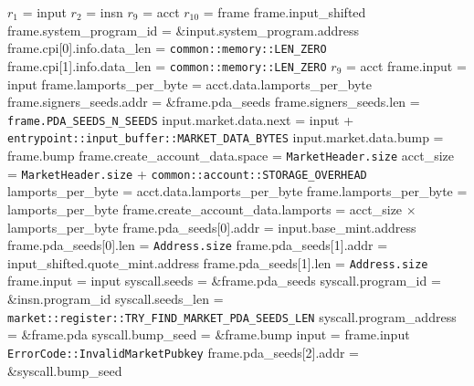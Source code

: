 \begin{algorithm}
\caption{INIT-MARKET-PDA}
\begin{algorithmic}
  \INPUT $r_1$ = input
  \INPUT $r_2$ = insn
  \INPUT $r_9$ = acct
  \INPUT $r_{10}$ = frame
  \REQUIRE frame.input\_shifted
  \REQUIRE frame.system\_program\_id = \&input.system\_program.address
  \REQUIRE frame.cpi[0].info.data\_len = \texttt{common::memory::LEN\_ZERO}
  \REQUIRE frame.cpi[1].info.data\_len = \texttt{common::memory::LEN\_ZERO}
  \ENSURE $r_9$ = acct
  \ENSURE frame.input = input
  \ENSURE frame.lamports\_per\_byte = acct.data.lamports\_per\_byte
  \ENSURE frame.signers\_seeds.addr = \&frame.pda\_seeds
  \ENSURE frame.signers\_seeds.len = \texttt{frame.PDA\_SEEDS\_N\_SEEDS}
  \ENSURE input.market.data.next = input + \texttt{entrypoint::input\_buffer::MARKET\_DATA\_BYTES}
  \ENSURE input.market.data.bump = frame.bump
  \STATE frame.create\_account\_data.space = \texttt{MarketHeader.size}
  \STATE acct\_size = \texttt{MarketHeader.size} + \texttt{common::account::STORAGE\_OVERHEAD}
  \STATE lamports\_per\_byte = acct.data.lamports\_per\_byte
  \STATE frame.lamports\_per\_byte = lamports\_per\_byte
  \STATE frame.create\_account\_data.lamports = acct\_size $\times$ lamports\_per\_byte
  \STATE frame.pda\_seeds[0].addr = input.base\_mint.address
  \STATE frame.pda\_seeds[0].len = \texttt{Address.size}
  \STATE frame.pda\_seeds[1].addr = input\_shifted.quote\_mint.address
  \STATE frame.pda\_seeds[1].len = \texttt{Address.size}
  \STATE frame.input = input
  \STATE syscall.seeds = \&frame.pda\_seeds
  \STATE syscall.program\_id = \&insn.program\_id
  \STATE syscall.seeds\_len = \texttt{market::register::TRY\_FIND\_MARKET\_PDA\_SEEDS\_LEN}
  \STATE syscall.program\_address = \&frame.pda
  \STATE syscall.bump\_seed = \&frame.bump
  \STATE {}
  \STATE input = frame.input
    \RETURN \texttt{ErrorCode::InvalidMarketPubkey}
  \ENDIF
  \STATE frame.pda\_seeds[2].addr = \&syscall.bump\_seed

\end{algorithmic}
\end{algorithm}
